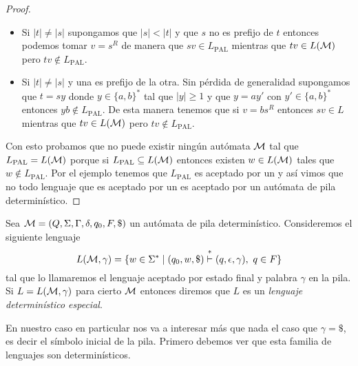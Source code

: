 \documentclass[tesis.tex]{subfiles}
\begin{document}
\begin{proof}
\begin{itemize}
		\item Si $|t|\neq |s|$ supongamos que $|s| < |t|$ y que $s$ no es prefijo de $t$ entonces  podemos tomar $v = s^R$ de manera que $sv \in L_{\text{PAL}}$ mientras que $tv \in L(\cal M)$ pero $tv \notin L_{\text{PAL}}$.
		
		\item Si $|t|\neq |s|$ y una es prefijo de la otra. 
		Sin pérdida de generalidad supongamos que $t=sy$ donde $y \in \{a,b\}^*$ tal que $|y| \ge 1$ y que $y = ay'$ con $y' \in \{a,b\}^*$ entonces $yb \notin L_{\text{PAL}}$.  
		De esta manera tenemos que si $v=bs^R$ entonces $sv \in L$ mientras que $tv \in L(\cal M)$ pero $tv \notin L_{\text{PAL}}$.		
	\end{itemize}
	
	Con esto probamos que no puede existir ningún autómata $\cal M$ tal que $L_{\text{PAL}} = L(\cal M)$ porque si $L_{\text{PAL}} \subseteq L(\cal M)$ entonces existen $w \in L(\cal M)$ tales que $w \notin L_{\text{PAL}}$.
	Por el ejemplo \label{ej_ic_palindromos} tenemos que $L_{\text{PAL}}$ es aceptado por un \APND y así vimos que no todo lenguaje que es aceptado por un \APND es aceptado por un autómata de pila determinístico.
	
\end{proof}

%

\begin{deff}
	Sea ${\cal {M}} = (Q,\Sigma, \Gamma, \delta, q_0, F, \$)$ un autómata de pila determinístico. 
	Consideremos el siguiente lenguaje
	\[
		L({\cal M}, \gamma) = \{ w \in \Sigma^{*} \mid (q_{0},w,\$) \overset{*}{\vdash} (q, \epsilon, \gamma), \ q \in F  \}
	\]
	tal que lo llamaremos el lenguaje aceptado por estado final y palabra $\gamma$ en la pila.
	Si $L = L({\cal M}, \gamma)$ para cierto $\cal M$ \APD entonces diremos que $L$ es un \emph{lenguaje \ic determinístico especial}. 
\end{deff}

En nuestro caso en particular nos va a interesar más que nada el caso que $\gamma = \$$, es decir el símbolo inicial de la pila.
Primero debemos ver que esta familia de lenguajes son \ic determinísticos.
\end{document}
